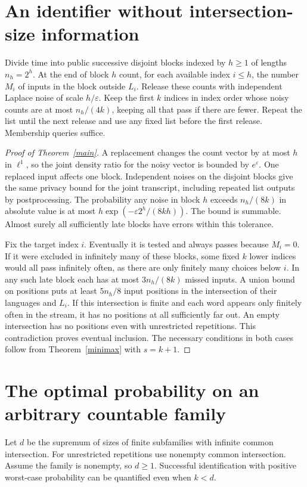 \documentclass[11pt]{article}
\begin{document}
\section{An identifier without intersection-size information}
Divide time into public successive disjoint blocks indexed by $h\ge1$ of lengths $n_h=2^h$. At the end of block $h$ count, for each available index $i\le h$, the number $M_i$ of inputs in the block outside $L_i$. Release these counts with independent Laplace noise of scale $h/\varepsilon$. Keep the first $k$ indices in index order whose noisy counts are at most $n_h/(4k)$, keeping all that pass if there are fewer. Repeat the list until the next release and use any fixed list before the first release. Membership queries suffice.

\begin{proof}[Proof of Theorem~\ref{main}]
A replacement changes the count vector by at most $h$ in $\ell^1$, so the joint density ratio for the noisy vector is bounded by $e^\varepsilon$. One replaced input affects one block. Independent noises on the disjoint blocks give the same privacy bound for the joint transcript, including repeated list outputs by postprocessing. The probability any noise in block $h$ exceeds $n_h/(8k)$ in absolute value is at most $h\exp(-\varepsilon 2^h/(8kh))$. The bound is summable. Almost surely all sufficiently late blocks have errors within this tolerance.

Fix the target index $i$. Eventually it is tested and always passes because $M_i=0$. If it were excluded in infinitely many of these blocks, some fixed $k$ lower indices would all pass infinitely often, as there are only finitely many choices below $i$. In any such late block each has at most $3n_h/(8k)$ missed inputs. A union bound on positions puts at least $5n_h/8$ input positions in the intersection of their languages and $L_i$. If this intersection is finite and each word appears only finitely often in the stream, it has no positions at all sufficiently far out. An empty intersection has no positions even with unrestricted repetitions. This contradiction proves eventual inclusion. The necessary conditions in both cases follow from Theorem~\ref{minimax} with $s=k+1$.
\end{proof}

\section{The optimal probability on an arbitrary countable family}
Let $d$ be the supremum of sizes of finite subfamilies with infinite common intersection. For unrestricted repetitions use nonempty common intersection. Assume the family is nonempty, so $d\ge1$. Successful identification with positive worst-case probability can be quantified even when $k<d$.
\end{document}
